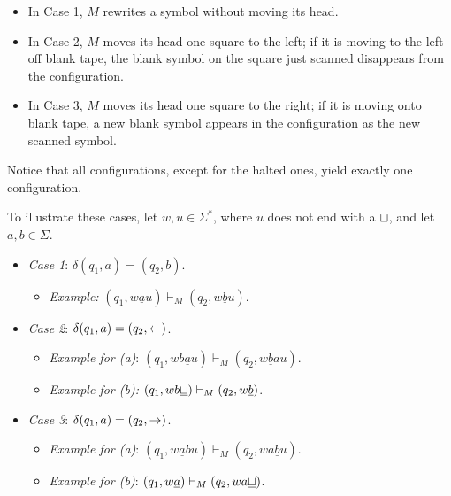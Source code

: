 \begin{itemize}
  \item In Case 1, $M$ rewrites a symbol without moving its head.
  \item In Case 2, $M$ moves its head one square to the left; if it is moving to the left off blank tape, the blank symbol on the square just scanned disappears from the configuration.
  \item In Case 3, $M$ moves its head one square to the right; if it is moving onto blank tape, a new blank symbol appears in the configuration as the new scanned symbol.
\end{itemize}
\noindent Notice that all configurations, except for the halted ones, yield exactly one configuration.
\begin{example}{}
To illustrate these cases, let $w, u \in \Sigma^*$, where $u$ does not end 
with a $\sqcup$, and let $a, b \in \Sigma$.
\begin{itemize}
  \item \textit{Case 1}: $\delta(q_1, a) = (q_2, b)$.
    \begin{itemize}[label={}]
      \item \textit{Example:} $(q_1, w\underline{a}u) \vdash_M (q_2, w\underline{b}u)$.
    \end{itemize}

  \item \textit{Case 2}: $\delta(q_1, a) = (q_2, \leftarrow)$.
    \begin{itemize}[label={}]
      \item \textit{Example for (a)}: $(q_1, wb\underline{a}u) \vdash_M (q_2, w\underline{b}au)$.
      \item \textit{Example for (b):} $(q_1, wb\underline{\sqcup}) \vdash_M (q_2, w\underline{b})$.
    \end{itemize}

  \item \textit{Case 3}: $\delta(q_1, a) = (q_2, \rightarrow)$.
    \begin{itemize}[label={}]
      \item \textit{Example for (a)}: $(q_1, w\underline{a}bu) \vdash_M (q_2, wa\underline{b}u)$.
      \item \textit{Example for (b)}: $(q_1, w\underline{a}) \vdash_M (q_2, wa\underline{\sqcup})$.
    \end{itemize}
\end{itemize}
\end{example}

\vspace*{\fill}
\columnbreak

